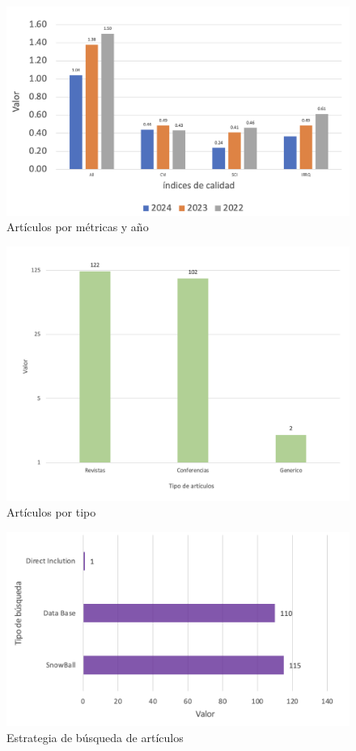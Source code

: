 \begin{figure}[H]
    \centering
    \includegraphics[scale=0.7]{tablas-images/cp2/diagrama-articulos-ano-metrica.png}
    \caption{Artículos por métricas y año}\label{fig:diagrama-articulos-ano-metrica}
\end{figure}

\begin{figure}[H]
    \centering
    \includegraphics[scale=0.5]{tablas-images/cp2/tipos-articulos.png}
    \caption{Artículos por tipo}\label{fig:tipos-articulos}
\end{figure}

\begin{figure}[H]
    \centering
    \includegraphics[scale=0.8]{tablas-images/cp2/estrategia-busqueda-articulos.png}
    \caption{Estrategia de búsqueda de artículos}\label{fig:estrategia-busqueda-articulos}
\end{figure}

